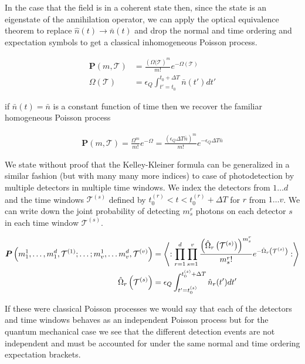 \documentclass[12pt]{article}
\newcommand{\ep}{\epsilon}
\newcommand{\bv}[1]{\boldsymbol{#1}}
\begin{document}
In the case that the field is in a coherent state then, since the state is an eigenstate of the annihilation operator, we can apply the optical equivalence theorem to replace $\hat{n}(t) \rightarrow \bar{n}(t)$ and drop the normal and time ordering and expectation symbols to get a classical inhomogeneous Poisson process.

\begin{align}
\bv{P}(m,\mathcal{T}) &= \frac{\left(\Omega(\mathcal{T}\right)^m}{m!} e^{-\Omega(\mathcal{T})}\\
\Omega(\mathcal{T}) &= \ep_Q \int_{t'=t_0}^{t_0+\Delta T} \bar{n}(t')dt'
\end{align}

if $\bar{n}(t) = \bar{n}$ is a constant function of time then we recover the familiar homogeneous Poisson process

\begin{align}
\bv{P}(m,\mathcal{T}) = \frac{\Omega^m}{m!}e^{-\Omega} = \frac{(\ep_Q \Delta T \bar{n})^m}{m!}e^{-\ep_Q \Delta T \bar{n}}
\end{align}

We state without proof that the Kelley-Kleiner formula can be generalized in a similar fashion (but with many many more indices) to case of photodetection by multiple detectors in multiple time windows. We index the detectors from $1 \ldots d$ and the time windows $\mathcal{T}^{(s)}$ defined by $t_0^{(r)} < t < t_0^{(r)}+\Delta T$ for $r$ from $1 \ldots v$. We can write down the joint probability of detecting $m_s^r$ photons on each detector $s$ in each time window $\mathcal{T}^{(s)}$.

\begin{align}
\bv{P}\left(m_1^1, \ldots, m_1^d, \mathcal{T}^{(1)}; \ldots ; m_v^1, \ldots m_v^d, \mathcal{T}^{(v)}\right) &= \Braket{:\prod_{r=1}^d \prod_{s=1}^v \frac{\left(\hat{\Omega}_r\left(\mathcal{T}^{(s)}\right) \right)^{m_s^r}}{m_s^r !} e^{-\hat{\Omega}_r\left(\mathcal{T}^{(s)}\right)}:}\\
\hat{\Omega}_r\left(\mathcal{T}^{(s)}\right) &= \ep_Q \int_{t' = t_0^{(s)}}^{t_0^{(s)} + \Delta T} \hat{n}_r(t') dt'
\end{align}

If these were classical Poisson processes we would say that each of the detectors and time windows behaves as an independent Poisson process but for the quantum mechanical case we see that the different detection events are not independent and must be accounted for under the same normal and time ordering expectation brackets.
\end{document}
